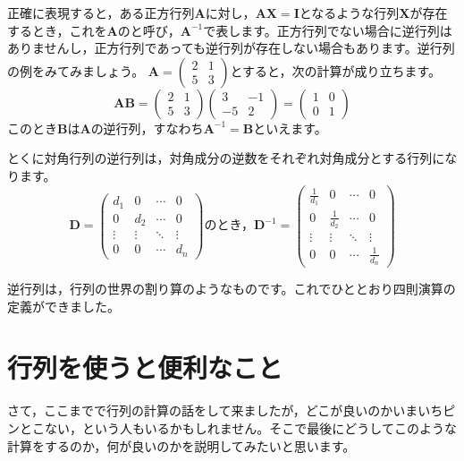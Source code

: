 \documentclass{ltjsbook}
\begin{document}
正確に表現すると，ある正方行列$\bm{A}$に対し，$\bm{A}\bm{X}=\bm{I}$となるような行列$\bm{X}$が存在するとき，これを$\bm{A}$のと呼び，$\bm{A}^{-1}$で表します。正方行列でない場合に逆行列はありませんし，正方行列であっても逆行列が存在しない場合もあります。逆行列の例をみてみましょう。
$\bm{A}=\begin{pmatrix}2&1\\5&3\end{pmatrix}$とすると，次の計算が成り立ちます。
\begin{equation*}
    \bm{AB}=\begin{pmatrix}2&1\\5&3\end{pmatrix}\begin{pmatrix}3&-1\\-5&2\end{pmatrix}=\begin{pmatrix}1&0\\0&1\end{pmatrix}
\end{equation*}
このとき$\bm{B}$は$\bm{A}$の逆行列，すなわち$\bm{A}^{-1}=\bm{B}$といえます。

とくに対角行列の逆行列は，対角成分の逆数をそれぞれ対角成分とする行列になります。
\begin{equation*}
    \bm{D} = \begin{pmatrix} d_1    & 0      & \cdots & 0      \\
                0      & d_2    & \cdots & 0      \\
                \vdots & \vdots & \ddots & \vdots \\
                0      & 0      & \cdots & d_n\end{pmatrix}
    \mbox{のとき，}
    \bm{D}^{-1} = \begin{pmatrix} \frac{1}{d_1} & 0             & \cdots & 0             \\
                0             & \frac{1}{d_2} & \cdots & 0             \\
                \vdots        & \vdots        & \ddots & \vdots        \\
                0             & 0             & \cdots & \frac{1}{d_n}\end{pmatrix}
\end{equation*}

逆行列は，行列の世界の割り算のようなものです。これでひととおり四則演算の定義ができました。

\section{行列を使うと便利なこと}
\label{MatrixAndEauqtion}
さて，ここまでで行列の計算の話をして来ましたが，どこが良いのかいまいちピンとこない，という人もいるかもしれません。そこで最後にどうしてこのような計算をするのか，何が良いのかを説明してみたいと思います。
\end{document}

